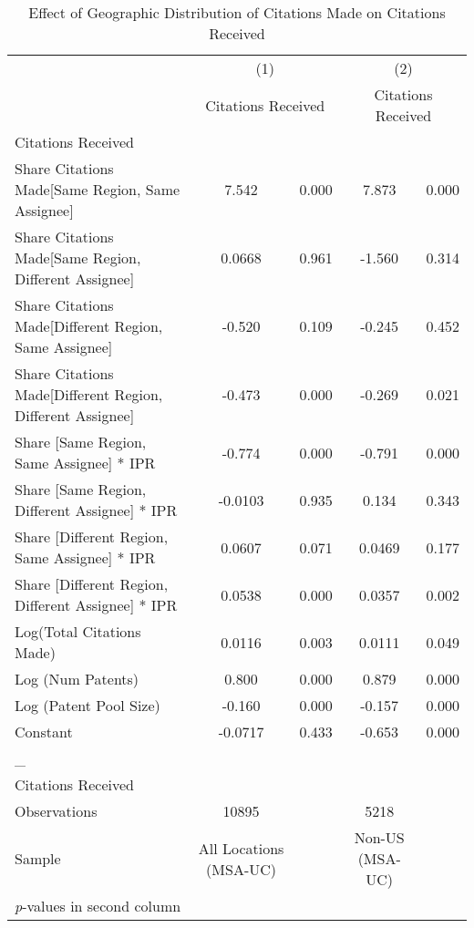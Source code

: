 {
\begin{longtable}{l*{2}{cc}}
\caption{Effect of Geographic Distribution of Citations Made on Citations Received \label{model34}}\\
\hline\hline\endfirsthead\hline\endhead\hline\endfoot\endlastfoot
                &\multicolumn{2}{c}{(1)}&\multicolumn{2}{c}{(2)}\\
                &\multicolumn{2}{c}{Citations Received}&\multicolumn{2}{c}{Citations Received}\\
\hline
Citations Received&         &         &         &         \\
Share Citations Made[Same Region, Same Assignee]&    7.542&    0.000&    7.873&    0.000\\
Share Citations Made[Same Region, Different Assignee]&   0.0668&    0.961&   -1.560&    0.314\\
Share Citations Made[Different Region, Same Assignee]&   -0.520&    0.109&   -0.245&    0.452\\
Share Citations Made[Different Region, Different Assignee]&   -0.473&    0.000&   -0.269&    0.021\\
Share [Same Region, Same Assignee] * IPR&   -0.774&    0.000&   -0.791&    0.000\\
Share [Same Region, Different Assignee] * IPR&  -0.0103&    0.935&    0.134&    0.343\\
Share [Different Region, Same Assignee] * IPR&   0.0607&    0.071&   0.0469&    0.177\\
Share [Different Region, Different Assignee] * IPR&   0.0538&    0.000&   0.0357&    0.002\\
Log(Total Citations Made)&   0.0116&    0.003&   0.0111&    0.049\\
Log (Num Patents)&    0.800&    0.000&    0.879&    0.000\\
Log (Patent Pool Size)&   -0.160&    0.000&   -0.157&    0.000\\
Constant        &  -0.0717&    0.433&   -0.653&    0.000\\
\hline
\_               &         &         &         &         \\
Citations Received&         &         &         &         \\
\hline
Observations    &    10895&         &     5218&         \\
Sample          &All Locations (MSA-UC)&         &Non-US (MSA-UC)&         \\
\hline\hline
\multicolumn{5}{l}{\footnotesize \textit{p}-values in second column}\\
\end{longtable}
}
